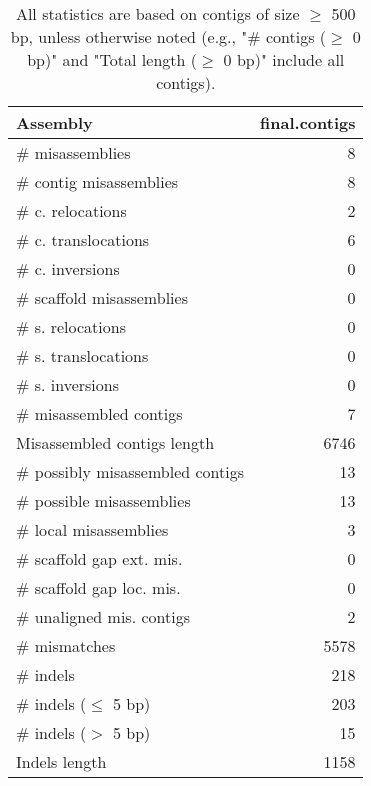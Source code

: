 \documentclass[12pt,a4paper]{article}
\begin{document}
\begin{table}[ht]
\begin{center}
\caption{All statistics are based on contigs of size $\geq$ 500 bp, unless otherwise noted (e.g., "\# contigs ($\geq$ 0 bp)" and "Total length ($\geq$ 0 bp)" include all contigs).}
\begin{tabular}{|l*{1}{|r}|}
\hline
Assembly & final.contigs \\ \hline
\# misassemblies & 8 \\ \hline
\hspace{2mm}\# contig misassemblies & 8 \\ \hline
\hspace{5mm}\# c. relocations & 2 \\ \hline
\hspace{5mm}\# c. translocations & 6 \\ \hline
\hspace{5mm}\# c. inversions & 0 \\ \hline
\hspace{2mm}\# scaffold misassemblies & 0 \\ \hline
\hspace{5mm}\# s. relocations & 0 \\ \hline
\hspace{5mm}\# s. translocations & 0 \\ \hline
\hspace{5mm}\# s. inversions & 0 \\ \hline
\# misassembled contigs & 7 \\ \hline
Misassembled contigs length & 6746 \\ \hline
\# possibly misassembled contigs & 13 \\ \hline
\hspace{5mm}\# possible misassemblies & 13 \\ \hline
\# local misassemblies & 3 \\ \hline
\# scaffold gap ext. mis. & 0 \\ \hline
\# scaffold gap loc. mis. & 0 \\ \hline
\# unaligned mis. contigs & 2 \\ \hline
\# mismatches & 5578 \\ \hline
\# indels & 218 \\ \hline
\hspace{5mm}\# indels ($\leq$ 5 bp) & 203 \\ \hline
\hspace{5mm}\# indels ($>$ 5 bp) & 15 \\ \hline
Indels length & 1158 \\ \hline
\end{tabular}
\end{center}
\end{table}
\end{document}
